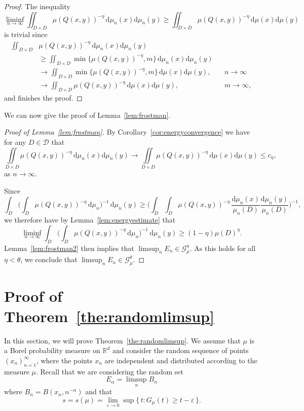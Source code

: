 \documentclass[11pt]{article}
\theoremstyle{definition}
\numberwithin{equation}{section}
\numberwithin{figure}{section}
\numberwithin{table}{section}
\newcommand*{\dd}{\mathrm{d}}
\begin{document}
\begin{proof}
The inequality
\[
\liminf_{n\to \infty} \iint_{D \times D} \mu (Q (x,y))^{-\eta} \,
\dd \mu_n (x) \dd \mu_n (y) \geq \iint_{D \times D} \mu(Q (x,y))^{-\eta} \, \dd\mu (x) \dd \mu (y)
\]
is trivial since
\begin{align*}
\iint_{D \times D} & \mu (Q (x,y))^{-\eta} \, \dd \mu_n (x)
\dd \mu_n (y) \\ & \geq \iint_{D \times D} \min \{ \mu (Q (x,y))^{-\eta}, m \} \, \dd \mu_n (x) \dd \mu_n (y)
\\ &\to \iint_{D \times D} \min \{ \mu (Q (x,y))^{-\eta}, m \} \,
\dd \mu (x) \dd \mu (y), && n \to \infty \\ &\to
\iint_{D \times D} \mu (Q (x,y))^{-\eta} \, \dd \mu (x)
\dd \mu (y), && m \to \infty,
\end{align*}
and finishes the proof.
\end{proof}

We can now give the proof of Lemma~\ref{lem:frostman}.

\begin{proof}[Proof of Lemma~\ref{lem:frostman}]
By Corollary~\ref{cor:energyconvergence} we have for any $D \in
\mathscr{D}$ that
\[
\iint\limits_{D \times D} \mu (Q(x,y))^{-\eta} \, \dd \mu_n (x) \dd \mu_n (y) \to \iint\limits_{D \times D} \mu (Q(x,y))^{-\eta} \, \dd \mu (x) \dd \mu (y) \leq c_\eta,
\]
as $n \to \infty$.

Since
\[
\int_D \biggl(\int_D \mu (Q(x,y))^{-\eta} \, \dd \mu_n
\biggr)^{-1} \, \dd \mu_n (y) \geq \biggl(\int_D \int_D
\mu(Q(x,y))^{-\eta} \, \frac{\dd \mu_n (x)}{\mu_n (D)}
\frac{\dd \mu_n (y)}{\mu_n (D)} \biggr)^{-1},
\]
we therefore have by Lemma~\ref{lem:energyestimate} that
\[
\liminf_{n \to \infty} \int_D \biggl(\int_D \mu (Q(x,y))^{-\eta}
\, \dd \mu_n \biggr)^{-1} \, \dd \mu_n (y)
\geq (1- \eta) \mu (D)^\eta.
\]
Lemma~\ref{lem:frostman2} then implies that $\limsup_n E_n \in
\mathscr{G}_\mu^\eta$. As this holds for all $\eta < \theta$, we conclude that $\limsup_n E_n \in \mathscr{G}_\mu^\theta$.
\end{proof}


\section{Proof of Theorem~\ref{the:randomlimsup}} \label{sec:randomproof}

In this section, we will prove Theorem~\ref{the:randomlimsup}. We assume that $\mu$ is a Borel probability measure on $\mathbb{R}^d$ and consider the random sequence of points $(x_n)_{n=1}^\infty$, where the points $x_n$ are independent and distributed according to the measure $\mu$. Recall that we are considering the random set
\[
E_\alpha = \limsup_n B_n
\]
where $B_n = B(x_n,n^{-\alpha})$ and that
\[
s = s(\mu) = \lim_{\varepsilon \to 0} \sup \{\, t : G_\mu (t) \geq t - \varepsilon \,\}.
\]
\end{document}
